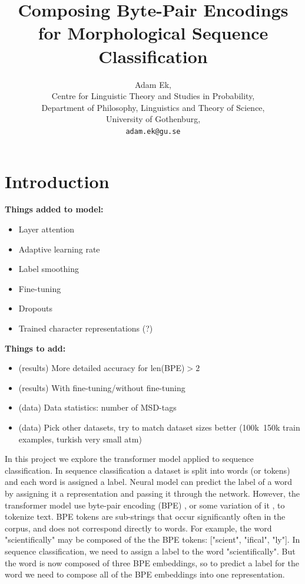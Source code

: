 \documentclass[11pt]{article}
\title{Composing Byte-Pair Encodings for Morphological Sequence Classification}
\author{Adam Ek,\\
	Centre for Linguistic Theory and Studies in Probability,\\
	Department of Philosophy, Linguistics and Theory of Science,\\
	University of Gothenburg,\\
	\texttt{adam.ek@gu.se}}
\date{}
\begin{document}
	\maketitle
	
	\section{Introduction}
	\label{intro}
	
	\textbf{Things added to model:}
	\begin{itemize}
		\item Layer attention
		\item Adaptive learning rate
		\item Label smoothing
		\item Fine-tuning
		\item Dropouts
		\item Trained character representations (?)
	\end{itemize}
	
	\textbf{Things to add:}
	\begin{itemize}
		\item (results) More detailed accuracy for len(BPE)$>2$
		\item (results) With fine-tuning/without fine-tuning
		\item (data) Data statistics: number of MSD-tags 
		\item (data) Pick other datasets, try to match dataset sizes better (100k~150k train examples, turkish very small atm)
	\end{itemize}
    
    In this project we explore the transformer model applied to sequence classification. In sequence classification a dataset is split into words (or tokens) and each word is assigned a label. 
    Neural model can predict the label of a word by assigning it a representation and passing it through the network. However, the transformer model use byte-pair encoding (BPE) \cite{sennrich2015neural}, or some variation of it \citep{devlin2018bert}, to tokenize text. 
    BPE tokens are sub-strings that occur significantly often in the corpus, and does not correspond directly to words. For example, the word "scientifically" may be composed of the the BPE tokens: ["scient", "ifical", "ly"].
    In sequence classification, we need to assign a label to the word "scientifically". But the word is now composed of three BPE embeddings, so to predict a label for the word we need to compose all of the BPE embeddings into one representation.
    
\end{document}
